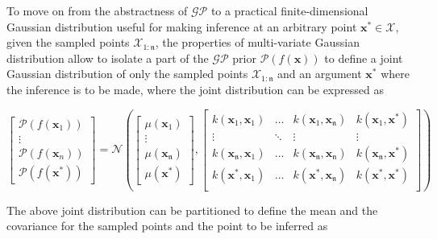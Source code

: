  To move on from the abstractness of  $\mathcal{GP}$ to a practical finite-dimensional Gaussian distribution useful for making inference at an arbitrary point  $\bm{x}^*\in \mathcal{X}$, given the sampled points $\mathcal{X}_{1:{\mathfrak{n}}}$, the properties of multi-variate Gaussian distribution allow to isolate a part of the $\mathcal{GP}$ prior $\mathcal{P}(f(\bm{x}))$ to define a joint Gaussian distribution of only the sampled points $\mathcal{X}_{1:{\mathfrak{n}}}$ and an argument $\bm{x}^*$ where the inference is to be made, where the joint distribution can be expressed as 
 
 \begin{equation}
  \begin{bmatrix}\mathcal{P}(f(\bm{x}_1)) \\\vdots\\\mathcal{P}(f(\bm{x}_n)) \\\mathcal{P}(f(\bm{x}^*)) \end{bmatrix}=\mathcal{N} \left( 
  \begin{bmatrix}
  \mu(\bm{x}_1) \\\vdots\\\mu(\bm{x}_\mathfrak{n}) \\\mu(\bm{x}^*) 
  \end{bmatrix},
%  
  \begin{bmatrix} 
k(\bm{x}_1,\bm{x}_1) &\hdots & k(\bm{x}_1,\bm{x}_\mathfrak{n}) & k(\bm{x}_1,\bm{x}^*)\\ 
\vdots & \ddots & \vdots & \vdots\\ 
k(\bm{x}_\mathfrak{n},\bm{x}_1)  &\hdots & k(\bm{x}_\mathfrak{n},\bm{x}_\mathfrak{n}) & k(\bm{x}_\mathfrak{n},\bm{x}^*)\\
k(\bm{x}^*,\bm{x}_1)  &\hdots & k(\bm{x}^*,\bm{x}_\mathfrak{n}) & k(\bm{x}^*,\bm{x}^*)\\
\end{bmatrix} \right)
\label{Joint_dist}
  \end{equation}
  
  The above joint distribution can be partitioned to define the mean and the covariance for the sampled points and the point to be inferred as
  
